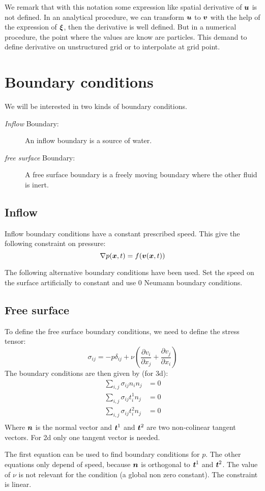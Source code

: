 \begin{remark}
We remark that with this notation some expression like spatial derivative of ${\boldsymbol {u}}$ is not defined.
In an analytical procedure, we can transform ${\boldsymbol {u}}$ to ${\boldsymbol {v}}$ with the help of the expression of ${\boldsymbol {\xi}}$, then the derivative is well defined.
But in a numerical procedure, the point where the values are know are particles. This demand to define derivative on unstructured grid
or to interpolate at grid point.
\end{remark}

\section{Boundary conditions}

We will be interested in two kinds of boundary conditions.
\begin{description}
 \item[\emph{Inflow} Boundary:]
 An inflow boundary is a source of water.
 \item[\emph{free surface} Boundary:]
 A free surface boundary is a freely moving boundary where the other fluid is inert.
\end{description}

\subsection{Inflow}

Inflow boundary conditions have a constant prescribed speed.
This give the following constraint on pressure:
\begin{equation}
\nabla p({\boldsymbol {x}},t)=f({\boldsymbol {v}}({\boldsymbol {x}},t))
\end{equation}

The following alternative boundary conditions have been used.
Set the speed on the surface artificially to constant and use 0 Neumann boundary conditions.


\subsection{Free surface}
\label{ana:free:surface}
To define the free surface boundary conditions, we need to define the stress tensor:
\begin{equation}
	\sigma_{ij}=-p \delta_{ij}+\nu\left(\frac{\partial v_{i}}{\partial x_{j}}+\frac{\partial v_{j}}{\partial x_{i}}\right)
\end{equation}
The boundary conditions are then given by (for 3d):
\begin{align}
	\sum_{i,j}\sigma_{ij}n_{i}n_{j}&=0\\
	\sum_{i,j}\sigma_{ij}t^{1}_{i}n_{j}&=0\\
	\sum_{i,j}\sigma_{ij}t^{2}_{i}n_{j}&=0\\
\end{align}
Where ${\boldsymbol {n}}$ is the normal vector and ${\boldsymbol {t}}^1$ and ${\boldsymbol {t}}^2$ are two non-colinear tangent vectors.
For 2d only one tangent vector is needed.

The first equation can be used to find boundary conditions for $p$.
The other equations only depend of speed, because ${\boldsymbol {n}}$ is orthogonal to ${\boldsymbol {t}}^{1}$ and ${\boldsymbol {t}}^{2}$.
The value of $\nu$ is not relevant for the condition (a global non zero constant).
The constraint is linear.